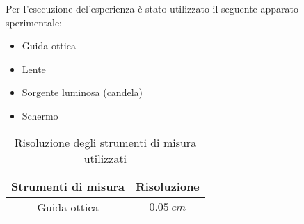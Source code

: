 Per l'esecuzione del'esperienza è stato utilizzato il seguente apparato sperimentale:
\begin{itemize}
	\item Guida ottica
	\item Lente
	\item Sorgente luminosa (candela)
	\item Schermo
\end{itemize}

\begin{table}[H]
	\centering
	\begin{tabular}{|c|c|}
		\hline
		\textbf{Strumenti di misura} & \textbf{Risoluzione} \\
		\hline
		Guida ottica & $0.05\ cm$ \\
		\hline
	\end{tabular}
	\caption{Risoluzione degli strumenti di misura utilizzati}
	\label{tab:}
\end{table}


